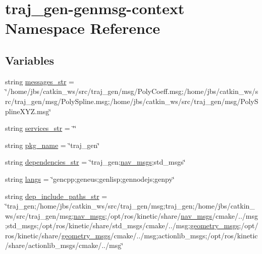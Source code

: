\hypertarget{namespacetraj__gen-genmsg-context}{}\section{traj\+\_\+gen-\/genmsg-\/context Namespace Reference}
\label{namespacetraj__gen-genmsg-context}
\subsection*{Variables}
\begin{DoxyCompactItemize}
\item 
string \hyperlink{namespacetraj__gen-genmsg-context_aa35e0362011f87c9efa81944ad02a72c}{messages\+\_\+str} = \char`\"{}/home/jbs/catkin\+\_\+ws/src/traj\+\_\+gen/msg/Poly\+Coeff.\+msg;/home/jbs/catkin\+\_\+ws/src/traj\+\_\+gen/msg/Poly\+Spline.\+msg;/home/jbs/catkin\+\_\+ws/src/traj\+\_\+gen/msg/Poly\+Spline\+X\+Y\+Z.\+msg\char`\"{}
\item 
string \hyperlink{namespacetraj__gen-genmsg-context_a61b5ee79b98f6990ece4339523c314cd}{services\+\_\+str} = \char`\"{}\char`\"{}
\item 
string \hyperlink{namespacetraj__gen-genmsg-context_ab5dc5dad70851fcfb8bd37f81a8f57e1}{pkg\+\_\+name} = \char`\"{}traj\+\_\+gen\char`\"{}
\item 
string \hyperlink{namespacetraj__gen-genmsg-context_a417c691ecce226ef2afe434ec5853bcf}{dependencies\+\_\+str} = \char`\"{}traj\+\_\+gen;\hyperlink{_spline_gen_8js_a1fa5a20fd50395f7b988c134be2a3d32}{nav\+\_\+msgs};std\+\_\+msgs\char`\"{}
\item 
string \hyperlink{namespacetraj__gen-genmsg-context_aca02eb8fb1f15eb63943df387811ddd1}{langs} = \char`\"{}gencpp;geneus;genlisp;gennodejs;genpy\char`\"{}
\item 
string \hyperlink{namespacetraj__gen-genmsg-context_abb5ac73d6c4fb1f9bd9518957d727d36}{dep\+\_\+include\+\_\+paths\+\_\+str} = \char`\"{}traj\+\_\+gen;/home/jbs/catkin\+\_\+ws/src/traj\+\_\+gen/msg;traj\+\_\+gen;/home/jbs/catkin\+\_\+ws/src/traj\+\_\+gen/msg;\hyperlink{_spline_gen_8js_a1fa5a20fd50395f7b988c134be2a3d32}{nav\+\_\+msgs};/opt/ros/kinetic/share/\hyperlink{_spline_gen_8js_a1fa5a20fd50395f7b988c134be2a3d32}{nav\+\_\+msgs}/cmake/../msg;std\+\_\+msgs;/opt/ros/kinetic/share/std\+\_\+msgs/cmake/../msg;\hyperlink{_spline_gen_8js_a57147b325f221018e8a885cfdabacab8}{geometry\+\_\+msgs};/opt/ros/kinetic/share/\hyperlink{_spline_gen_8js_a57147b325f221018e8a885cfdabacab8}{geometry\+\_\+msgs}/cmake/../msg;actionlib\+\_\+msgs;/opt/ros/kinetic/share/actionlib\+\_\+msgs/cmake/../msg\char`\"{}

\end{DoxyCompactItemize}
